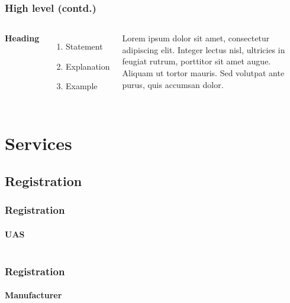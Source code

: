 \documentclass[usenames,dvipsnames,aspectratio=169,serif]{beamer}
\begin{document}

\begin{frame}
   \frametitle{High level (contd.)}
   \begin{columns}[t] %

      \textbf{Heading}
      \begin{enumerate}
         \item Statement
         \item Explanation
         \item Example
      \end{enumerate}

      Lorem ipsum dolor sit amet, consectetur adipiscing elit. Integer lectus nisl, ultricies in feugiat rutrum, porttitor sit amet augue. Aliquam ut tortor mauris. Sed volutpat ante purus, quis accumsan dolor.

   \end{columns}
\end{frame}

\section{Services}

\subsection{Registration}
\begin{frame}
   \frametitle{Registration}
   \framesubtitle{UAS}
   \begin{columns}[t]
      \begin{column}{0.5\textwidth}
      \end{column}
      \begin{column}{0.5\textwidth}
      \end{column}
   \end{columns}
\end{frame}

\begin{frame}
   \frametitle{Registration}
   \framesubtitle{Manufacturer}
   \begin{columns}[t]
      \begin{column}{0.5\textwidth}
      \end{column}
      \begin{column}{0.5\textwidth}
      \end{column}
   \end{columns}
\end{frame}
\end{document}
